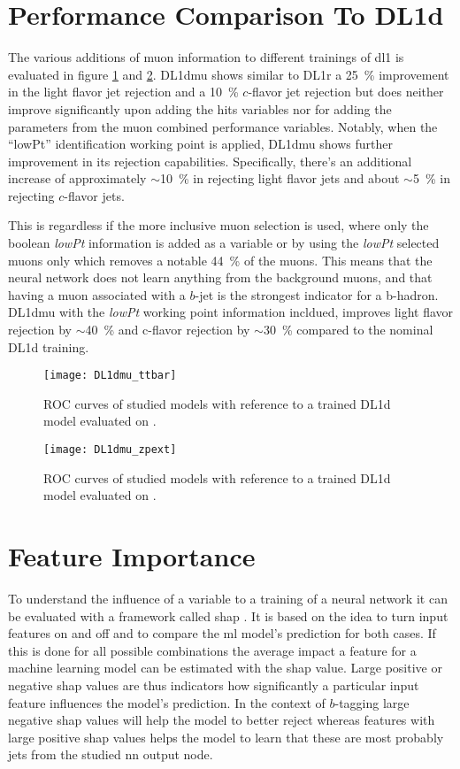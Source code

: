 \section{Performance Comparison To DL1d}
The various additions of muon information to different trainings of \ac{dl1} is evaluated in figure \ref{fig:DL1dmu_ttbar} and \ref{fig:DL1dmu_zpext}. DL1dmu shows similar to DL1r a \qty{25}{\percent} improvement in the light flavor jet rejection and a \qty{10}{\percent} $c$-flavor jet rejection but does neither improve significantly upon adding the hits variables nor for adding the parameters from the muon combined performance variables. Notably, when the ``lowPt'' identification working point is applied, DL1dmu shows further improvement in its rejection capabilities. Specifically, there's an additional increase of approximately $\sim$\qty{10}{\percent} in rejecting light flavor jets and about $\sim$\SI{5}{\percent} in rejecting $c$-flavor jets.

This is regardless if the more inclusive muon selection is used, where only the boolean \textit{lowPt} information is added as a variable or by using the \textit{lowPt} selected muons only which removes a notable \qty{44}{\percent} of the muons. This means that the neural network does not learn anything from the background muons, and that having a muon associated with a $b$-jet is the strongest indicator for a b-hadron. DL1dmu with the \textit{lowPt} working point information incldued, improves light flavor rejection by $\sim$\qty{40}{\percent} and c-flavor rejection by $\sim$\qty{30}{\percent} compared to the nominal DL1d training.

\begin{figure}[]
  \centering
  \texttt{[image: DL1dmu\_ttbar]}
  \caption{ROC curves of studied models with reference to a trained DL1d model evaluated on \ttbar.}
  \label{fig:DL1dmu_ttbar}
\end{figure}
\begin{figure}[]
  \centering
  \texttt{[image: DL1dmu\_zpext]}
  \caption{ROC curves of studied models with reference to a trained DL1d model evaluated on \Zprime.}
  \label{fig:DL1dmu_zpext}
\end{figure}

\section{Feature Importance}
To understand the influence of a variable to a training of a neural network it can be evaluated with a framework called \ac{shap} \citep{shap,NIPS2017_7062}. It is based on the idea to turn input features on and off and to compare the \ac{ml} model's prediction for both cases. If this is done for all possible combinations the average impact a feature for a machine learning model can be estimated with the \ac{shap} value. Large positive or negative \ac{shap} values are thus indicators how significantly a particular input feature influences the model's prediction. In the context of $b$-tagging large negative \ac{shap} values will help the model to better reject whereas features with large positive \ac{shap} values helps the model to learn that these are most probably jets from the studied \ac{nn} output node.

